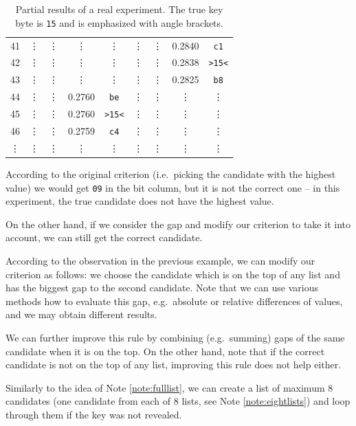 \begin{example}
\begin{table}[H]
\begin{center}
\begin{tabular}{| c | c | c | c | c | c | c | c | c |}
					41     & \vdots & \vdots     & \vdots & \vdots     & \vdots & \vdots     & 0.2840 & {\tt c1}   \\
					42     & \vdots & \vdots     & \vdots & \vdots     & \vdots & \vdots     & 0.2838 & {\tt >15<} \\
					43     & \vdots & \vdots     & \vdots & \vdots     & \vdots & \vdots     & 0.2825 & {\tt b8}   \\
					44     & \vdots & \vdots     & 0.2760 & {\tt be}   & \vdots & \vdots     & \vdots & \vdots     \\
					45     & \vdots & \vdots     & 0.2760 & {\tt >15<} & \vdots & \vdots     & \vdots & \vdots     \\
					46     & \vdots & \vdots     & 0.2759 & {\tt c4}   & \vdots & \vdots     & \vdots & \vdots     \\
					\vdots & \vdots & \vdots     & \vdots & \vdots     & \vdots & \vdots     & \vdots & \vdots     \\
				\hline
			\end{tabular}
			\end{center}
		\caption{Partial results of a real experiment. The true key byte is {\tt 15} and is emphasized with angle brackets.}
		\label{tab:gap}
		\end{table}
		According to the original criterion (i.e.\ picking the candidate with the highest value) we would get {\tt 09} in the  bit column, but it is not the correct one -- in this experiment, the true candidate does not have the highest value.
		
		On the other hand, if we consider the gap and modify our criterion to take it into account, we can still get the correct candidate.
	\end{example}
	
	\begin{remark}
	\label{rem:gap}
		According to the observation in the previous example, we can modify our criterion as follows: we choose the candidate which is on the top of any list and has the biggest gap to the second candidate. Note that we can use various methods how to evaluate this gap, e.g.\ absolute or relative differences of values, and we may obtain different results.
		
		We can further improve this rule by combining (e.g.\ summing) gaps of the same candidate when it is on the top. On the other hand, note that if the correct candidate is not on the top of any list, improving this rule does not help either.
		
		Similarly to the idea of Note \ref{note:fulllist}, we can create a list of maximum $8$ candidates (one candidate from each of $8$ lists, see Note \ref{note:eightlists}) and loop through them if the key was not revealed.
	\end{remark}
	
